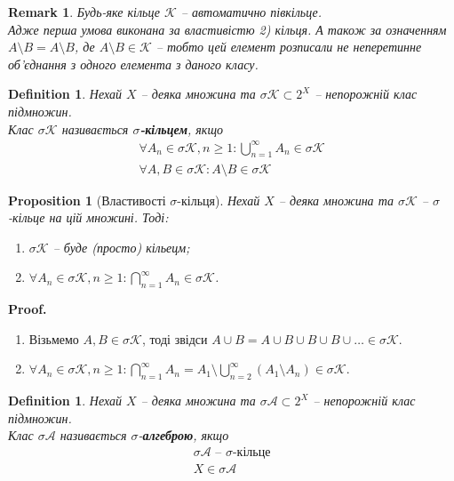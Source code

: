 \documentclass[a4paper, 10pt]{article}
\makeatletter
\theoremstyle{theoremdd}
\newtheorem{definition}[theorem]{Definition}
\newtheorem{proposition}[theorem]{Proposition}
\newtheorem{remark}[theorem]{Remark}
\renewenvironment{proof}[1][Proof.\\]{\par
\pushQED{\hfill \qed}%
\normalfont \topsep6\p@\@plus6\p@\relax
\trivlist
\item\relax
{\bfseries
#1\@addpunct{.}}\hspace\labelsep\ignorespaces
}{%
\popQED\endtrivlist\@endpefalse
}
\newcommand\nospacebeforeitem{
\vspace{-\topsep}
\vspace{-\topsep}
\vspace{-\topsep}
}
\makeatother
\begin{document}
\begin{remark}
Будь-яке кільце $\mathcal{K}$ -- автоматично півкільце.\\
Адже перша умова виконана за властивістю 2) кільця. А також за означенням $A \setminus B = A \setminus B$, де $A \setminus B \in \mathcal{K}$ -- тобто цей елемент розписали не неперетинне об'єднання з одного елемента з даного класу.
\end{remark}

\begin{definition}
Нехай $X$ -- деяка множина та $\sigma \mathcal{K} \subset 2^X$ -- непорожній клас підмножин.\\
Клас $\sigma \mathcal{K}$ називається \textbf{$\sigma$-кільцем}, якщо
\begin{align*}
\forall A_n \in \sigma\mathcal{K}, n \geq 1: \bigcup_{n=1}^\infty A_n \in \sigma\mathcal{K} \\
\forall A,B \in \sigma\mathcal{K}: A \setminus B \in \sigma\mathcal{K}
\end{align*}
\end{definition}

\begin{proposition}[Властивості $\sigma$-кільця]
Нехай $X$ -- деяка множина та $\sigma\mathcal{K}$ -- $\sigma$-кільце на цій множині. Тоді:
\begin{enumerate}[nosep,wide=0pt,label={\arabic*)}]
\item $\sigma \mathcal{K}$ -- буде (просто) кільецм;
\item $\forall A_n \in \sigma\mathcal{K}, n \geq 1: \displaystyle\bigcap_{n=1}^\infty A_n \in \sigma\mathcal{K}$.
\end{enumerate}
\end{proposition}

\begin{proof}
\nospacebeforeitem
\begin{enumerate}[wide=0pt,label={\arabic*)}]
\item Візьмемо $A,B \in \sigma \mathcal{K}$, тоді звідси $A \cup B = A \cup B \cup B \cup B \cup \dots \in \sigma \mathcal{K}$.
\item $\forall A_n \in \sigma \mathcal{K}, n \geq 1: \displaystyle\bigcap_{n=1}^\infty A_n = A_1 \setminus \bigcup_{n=2}^\infty (A_1 \setminus A_n) \in \sigma \mathcal{K}$. \qedhere
\end{enumerate}
\end{proof}

\begin{definition}
Нехай $X$ -- деяка множина та $\sigma\mathcal{A} \subset 2^X$ -- непорожній клас підмножин.\\
Клас $\sigma\mathcal{A}$ називається $\sigma$-\textbf{алгеброю}, якщо
\begin{align*}
\sigma\mathcal{A} \text{ -- $\sigma$-кільце} \\
X \in \sigma\mathcal{A}
\end{align*}
\end{definition}
\end{document}
